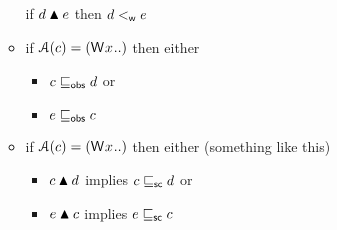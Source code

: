 \begin{itemize}
\begin{itemize}
      if $d \mathbin{\blacktriangle} e$ then $d <_\mathsf{w} e$
    \item[{\labeltextsc[F4]{(F4)}{rf4}}]
      if $\labelingAct(\cEv)=(\DW{x}{..})$ then either
      \begin{itemize}
      \item $c \sqsubseteq_\mathsf{obs} d$ or
      \item $e \sqsubseteq_\mathsf{obs} c$
    \end{itemize}
    \item[{\labeltextsc[F4]{(F4)}{rf4}}]
      if $\labelingAct(\cEv)=(\DW{x}{..})$ then either  (something like this)
      \begin{itemize}
      \item $c\mathbin{\blacktriangle}d$ implies $c \sqsubseteq_\mathsf{sc} d$ or
      \item $e\mathbin{\blacktriangle}c$ implies $e \sqsubseteq_\mathsf{sc} c$      
      \end{itemize}
    \end{itemize}


\end{itemize}
